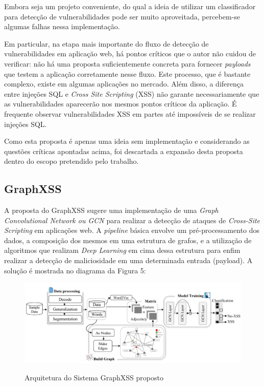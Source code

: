 Embora seja um projeto conveniente, do qual a ideia de utilizar um classificador para detecção de vulnerabilidades pode ser muito aproveitada,  percebem-se algumas falhas nessa implementação. 

Em particular, na etapa mais importante do fluxo de detecção de vulnerabilidades em aplicação web, há pontos críticos que o autor não cuidou de verificar: não há uma proposta suficientemente concreta para fornecer \textit{payloads} que testem a aplicação corretamente nesse fluxo. Este processo, que é bastante complexo, existe em algumas aplicações no mercado. Além disso, a diferença entre injeções SQL e \textit{Cross Site Scripting} (XSS) não garante necessariamente  que as vulnerabilidades aparecerão nos mesmos pontos críticos da aplicação. É frequente observar vulnerabilidades XSS em partes até impossíveis de se realizar injeções SQL.

Como esta proposta é apenas uma ideia sem implementação e considerando as questões críticas apontadas acima, foi descartada a expansão desta proposta dentro do escopo pretendido pelo trabalho.

\subsection{GraphXSS}
A proposta do GraphXSS \cite{liu_graphxss_2022} sugere uma implementação de uma \textit{Graph Convolutional Network ou GCN} para realizar a detecção de ataques de \textit{Cross-Site Scripting} em aplicações web. A \textit{pipeline} básica envolve um pré-processamento dos dados, a composição dos mesmos em uma estrutura de grafos, e a utilização de algoritmos que realizam \textit{Deep Learning} em cima dessa estrutura para enfim realizar a detecção de maliciosidade em uma determinada entrada (payload). A solução é mostrada no diagrama da Figura 5: 

\begin{figure}[H]
    \centering
    \caption{Arquitetura do Sistema GraphXSS proposto}
    \includegraphics[width=14cm]{figuras/graphXSS.png} 
    \label{fig:internet} 
\end{figure}

